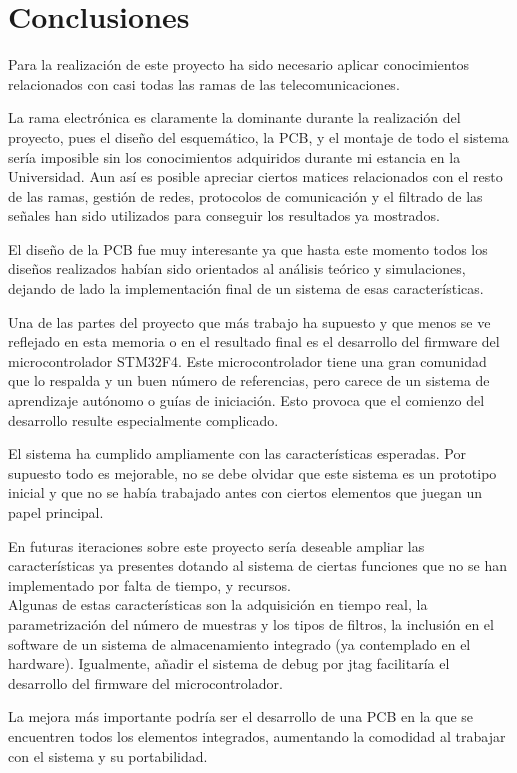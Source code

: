 \chapter{Conclusiones\label{sec:conclusiones}}

Para la realización de este proyecto ha sido necesario aplicar conocimientos relacionados con casi todas las ramas de las telecomunicaciones.

La rama electrónica es claramente la dominante durante la realización del proyecto, pues el diseño del esquemático, la \acrshort{PCB}, y el montaje de todo el sistema sería imposible sin los conocimientos adquiridos durante mi estancia en la Universidad. Aun así es posible apreciar ciertos matices relacionados con el resto de las ramas, gestión de redes, protocolos de comunicación y el filtrado de las señales han sido utilizados para conseguir los resultados ya mostrados.

El diseño de la \acrshort{PCB} fue muy interesante ya que hasta este momento todos los diseños realizados habían sido orientados al análisis teórico y simulaciones, dejando de lado la implementación final de un sistema de esas características.

Una de las partes del proyecto que más trabajo ha supuesto y que menos se ve reflejado en esta memoria o en el resultado final es el desarrollo del firmware del microcontrolador STM32F4. Este microcontrolador tiene una gran comunidad que lo respalda y un buen número de referencias, pero carece de un sistema de aprendizaje autónomo o guías de iniciación. Esto provoca que el comienzo del desarrollo resulte especialmente complicado.

El sistema ha cumplido ampliamente con las características esperadas. Por supuesto todo es mejorable, no se debe olvidar que este sistema es un prototipo inicial y que no se había trabajado antes con ciertos elementos que juegan un papel principal.

\clearpage

En futuras iteraciones sobre este proyecto sería deseable ampliar las características ya presentes dotando al sistema de ciertas funciones que no se han implementado por falta de tiempo, y recursos.\\
Algunas de estas características son la adquisición en tiempo real, la parametrización del número de muestras y los tipos de filtros, la inclusión en el software de un sistema de almacenamiento integrado (ya contemplado en el hardware). Igualmente, añadir el sistema de debug por jtag facilitaría el desarrollo del firmware del microcontrolador.

La mejora más importante podría ser el desarrollo de una \acrshort{PCB} en la que se encuentren todos los elementos integrados, aumentando la comodidad al trabajar con el sistema y su portabilidad.


